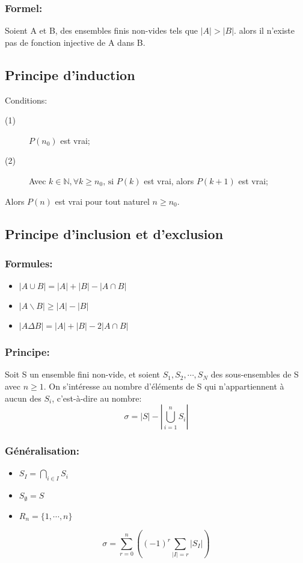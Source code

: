 \subsubsection*{Formel:}
Soient A et B, des ensembles finis non-vides tels que $|A| > |B|$. alors il n'existe pas de fonction injective de A dans B.
\subsection{Principe d'induction}
Conditions:
\begin{description}
\item[(1)] $P(n_0)$ est vrai;
\item[(2)] Avec $k \in \mathbb{N} , \forall k \geq n_0 \text{, si }P(k)$ est vrai, alors $P(k+1)$ est vrai;
\end{description}
Alors $P(n)$ est vrai pour tout naturel $n \geq n_0$.
\subsection{Principe d'inclusion et d'exclusion}
\subsubsection*{Formules:}
\begin{itemize}
\item $|A \cup B| = |A| + |B| - |A \cap B|$
\item $|A\backslash B| \geq |A| - |B|$
\item $|A \Delta B| = |A| + |B| - 2|A \cap B|$
\end{itemize}
\subsubsection*{Principe:}
Soit S un ensemble fini non-vide, et soient $S_1, S_2, \cdots ,S_N$ des sous-ensembles de S avec $n \geq 1$. On s'intéresse au nombre d'éléments de S qui n'appartiennent à aucun des $S_i$, c'est-à-dire au nombre:
\[\sigma =|S| - \left | \bigcup_{i = 1}^n S_i \right |\]
\subsubsection*{Généralisation:}
\begin{itemize}
\item $S_I = \bigcap_{i \in I} S_i$
\item $S_{\emptyset} = S$
\item $R_n = \{1, \cdots , n\}$
\end{itemize}
\[\sigma = \sum_{r = 0}^n\left ( (-1)^r \sum_{|I| = r}|S_I| \right )\]

